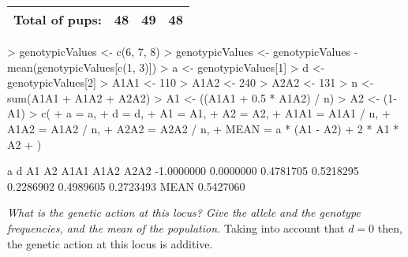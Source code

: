 \documentclass[12pt,a4paper]{paper}
\begin{document}
\begin{enumerate}
\begin{center}
\begin{tabular}{|r|c|c|c|}
\hline
Total of pups:&48&49&48\\
\hline
\end{tabular}
\end{center}
\begin{Schunk}
\begin{Sinput}
> genotypicValues <- c(6, 7, 8)
> genotypicValues <- genotypicValues - mean(genotypicValues[c(1, 3)])
> a <-  genotypicValues[1]
> d <- genotypicValues[2]
> A1A1 <- 110
> A1A2 <- 240
> A2A2 <- 131
> n <- sum(A1A1 + A1A2 + A2A2)
> A1 <- ((A1A1 + 0.5 * A1A2) / n)
> A2 <- (1-A1)
> c(
+   a = a,
+   d = d,
+   A1 = A1,
+   A2 = A2,
+   A1A1 = A1A1 / n,
+   A1A2 = A1A2 / n,
+   A2A2 = A2A2 / n,
+   MEAN = a * (A1 - A2) + 2 * A1 * A2
+ )
\end{Sinput}
\begin{Soutput}
         a          d         A1         A2       A1A1       A1A2       A2A2 
-1.0000000  0.0000000  0.4781705  0.5218295  0.2286902  0.4989605  0.2723493 
      MEAN 
 0.5427060 
\end{Soutput}
\end{Schunk}
\emph{What is the genetic action at this locus? Give the allele and the genotype frequencies, and the mean of the population.} Taking into account that $d = 0$ then, the genetic action at this locus is additive. 
\end{enumerate}
\end{document}
